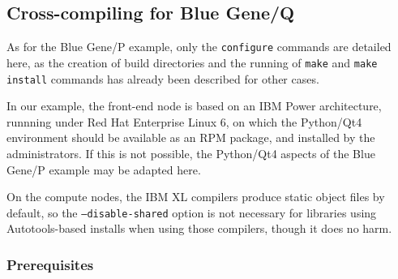 \documentclass[a4paper,10pt,twoside]{article}
\begin{document}

\subsection{Cross-compiling for Blue Gene/Q}

As for the Blue Gene/P example, only the \texttt{configure} commands are
detailed here, as the creation of build directories and the running of
\texttt{make} and \texttt{make install} commands has already
been described for other cases.

In our example, the front-end node is based on an IBM Power architecture,
runnning under Red Hat Enterprise Linux 6, on which the Python/Qt4
environment should be available as an RPM package, and installed by the
administrators. If this is not possible, the Python/Qt4 aspects of the
Blue Gene/P example may be adapted here.

On the compute nodes, the IBM XL compilers produce static object files
by default, so the \texttt{--disable-shared} option is not necessary
for libraries using Autotools-based installs when using those compilers,
though it does no harm.

\subsubsection{Prerequisites}
\end{document}
